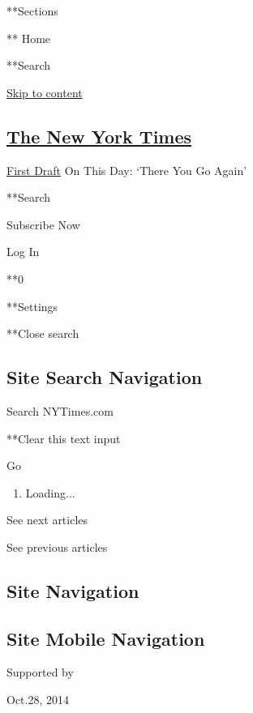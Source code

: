 **Sections

** Home

**Search

\protect\hyperlink{main}{Skip to content}

\hypertarget{the-new-york-times}{%
\subsection{\texorpdfstring{\href{https://www.nytimes3xbfgragh.onion/}{The
New York Times}}{The New York Times}}\label{the-new-york-times}}

 \href{//www.nytimes3xbfgragh.onion/politics/first-draft}{First Draft}
\textbar{} On This Day: `There You Go Again'

**Search

Subscribe Now

Log In

**0

**Settings

**Close search

\hypertarget{site-search-navigation}{%
\subsection{Site Search Navigation}\label{site-search-navigation}}

Search NYTimes.com

**Clear this text input

Go

\begin{enumerate}
\def\labelenumi{\arabic{enumi}.}
\item
  Loading...
\end{enumerate}

See next articles

See previous articles

\hypertarget{site-navigation}{%
\subsection{Site Navigation}\label{site-navigation}}

\hypertarget{site-mobile-navigation}{%
\subsection{Site Mobile Navigation}\label{site-mobile-navigation}}

Supported by

\href{javascript:;}{ }
\href{//www.nytimes3xbfgragh.onion/politics/first-draft/}{} Oct.28, 2014

